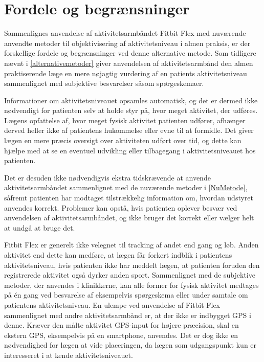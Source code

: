 \section{Fordele og begrænsninger}\label{sec:tek_fordelebegr}
Sammenlignes anvendelse af aktivitetsarmbåndet Fitbit Flex med nuværende anvendte metoder til objektivisering af aktivitetsniveau i almen praksis, er der forskellige fordele og begrænsninger ved denne alternative metode. Som tidligere nævnt i \autoref{alternativemetoder} giver anvendelsen af aktivitetsarmbånd den almen praktiserende læge en mere nøjagtig vurdering af en patients aktivitetsniveau sammenlignet med subjektive besvarelser såsom spørgeskemaer.

Informationer om aktivitetsniveauet opsamles automatisk, og det er dermed ikke nødvendigt for patienten selv at holde styr på, hvor meget aktivitet, der udføres. Lægens opfattelse af, hvor meget fysisk aktivitet patienten udfører, afhænger derved heller ikke af patientens hukommelse eller evne til at formidle. Det giver lægen en mere præcis oversigt over aktiviteten udført over tid, og dette kan hjælpe med at se en eventuel udvikling eller tilbagegang i aktivitetsniveauet hos patienten. 

Det er desuden ikke nødvendigvis ekstra tidskrævende at anvende aktivitetsarmbåndet sammenlignet med de nuværende metoder i \autoref{NuMetode}, såfremt patienten har modtaget tilstrækkelig information om, hvordan udstyret anvendes korrekt. Problemer kan opstå, hvis patienten oplever besvær ved anvendelsen af aktivitetsarmbåndet, og ikke bruger det korrekt eller vælger helt at undgå at bruge det.

Fitbit Flex er generelt ikke velegnet til tracking af andet end gang og løb. Anden aktivitet end dette kan medføre, at lægen får forkert indblik i patientens aktivitetsniveau, hvis patienten ikke har meddelt lægen, at patienten foruden den registrerede aktivitet også dyrker anden sport. Sammenlignet med de subjektive metoder, der anvendes i klinikkerne, kan alle former for fysisk aktivitet medtages på én gang ved besvarelse af eksempelvis spørgeskema eller under samtale om patientens aktivitetsniveau.
En ulempe ved anvendelse af Fitbit Flex sammenlignet med andre aktivitetsarmbånd er, at der ikke er indbygget GPS i denne. Kræver den målte aktivitet GPS-input for højere præcision, skal en ekstern GPS, eksempelvis på en smartphone, anvendes. Det er dog ikke en nødvendighed for lægen at vide placeringen, da lægen som udgangspunkt kun er interesseret i at kende aktivitetsniveauet.

